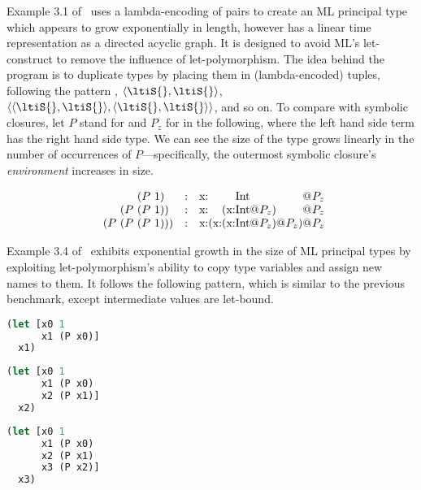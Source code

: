 Example 3.1 of~\cite{kanellakis1989polymorphic} uses a lambda-encoding of pairs to create an ML principal type
which appears to grow exponentially in length, however has a linear time representation as a directed acyclic graph.
It is designed to avoid ML's let-construct to remove the influence of let-polymorphism.
The idea behind the program is to duplicate types \ltiS{} by placing them in (lambda-encoded) tuples,
following the pattern \ltiS{}, $\langle\ltiS{},\ltiS{}\rangle$, $\langle\langle\ltiS{},\ltiS{}\rangle,\langle\ltiS{},\ltiS{}\rangle\rangle$,
and so on.
To compare with symbolic closures,
let $P$ stand for 
and $P_z$ for  in the following, where the left
hand side term has the right hand side type.
We can see the size of the type grows linearly in the number of occurrences of $P$---specifically,
the outermost symbolic closure's \emph{environment} increases in size.

{
\[
\begin{array}{c@{}c@{}c@{}c@{}ccr@{}r@{}r@{}r@{}r@{}r@{}r@{}r@{}r}
  &&{(P\ 1)}&&        & : &    \ltiClosure{\hastype{\text{x}}{&&&\text{Int}&&}&}{P_z}\\
  &{(P\ } &{(P\ 1)}& {)}&    & : &   \ltiClosure{\hastype{\text{x}}
                                                 {&&(\ltiClosure{\hastype{\text{x}}{&\text{Int}&}}{{P_z}})&&}}
                                                {P_z}\\
{(P\ }&{(P\ }&{(P\ 1)}&{)}&{)}    & : &   \ltiClosure{\hastype{\text{x}}
                                                      {&(\ltiClosure{\hastype{\text{x}}{&(\ltiClosure{\hastype{\text{x}}{&\text{Int}&}}{P_z})&}}{P_z})}&}
                                                     {P_z}
\end{array}
\]
}

Example 3.4 of~\cite{kanellakis1989polymorphic}
exhibits exponential growth in the size of ML principal types by exploiting
let-polymorphism's ability to copy type variables and assign new names to them.
It follows the following pattern, which is similar to the previous benchmark, except
intermediate values are let-bound.

\begin{minipage}[t]{0.3\linewidth}
\begin{lstlisting}[language=Clojure]
(let [x0 1
      x1 (P x0)]
  x1)
\end{lstlisting}
\end{minipage}
%
\begin{minipage}[t]{0.3\linewidth}
\begin{lstlisting}[language=Clojure]
(let [x0 1
      x1 (P x0)
      x2 (P x1)]
  x2)
\end{lstlisting}
\end{minipage}
%
\begin{minipage}[t]{0.3\linewidth}
\begin{lstlisting}[language=Clojure]
(let [x0 1
      x1 (P x0)
      x2 (P x1)
      x3 (P x2)]
  x3)
\end{lstlisting}
\end{minipage}

